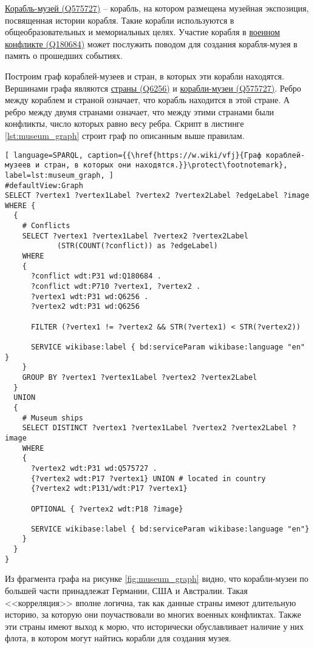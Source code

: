 \href{https://www.wikidata.org/wiki/Q575727}{Корабль-музей (Q575727)} -- корабль, на котором размещена музейная экспозиция, посвященная истории корабля. Такие корабли используются в общеобразовательных и мемориальных целях. Участие корабля в \href{https://www.wikidata.org/wiki/Q180684}{военном конфликте (Q180684)} может послужить поводом для создания корабля-музея в память о прошедших событиях. 

Построим граф кораблей-музеев и стран, в которых эти корабли находятся. Вершинами графа являются \href{https://www.wikidata.org/wiki/Q6256}{страны (Q6256)} и \href{https://www.wikidata.org/wiki/Q575727}{корабли-музеи (Q575727)}. Ребро между кораблем и страной означает, что корабль находится в этой стране. А ребро между двумя странами означает, что между этими странами были конфликты, число которых равно весу ребра. Скрипт в листинге \ref{lst:museum_graph} строит граф по описанным выше правилам.

\begin{lstlisting}[ language=SPARQL, caption={{\href{https://w.wiki/vfj}{Граф кораблей-музеев и стран, в которых они находятся.}}\protect\footnotemark}, label=lst:museum_graph, ]
#defaultView:Graph    
SELECT ?vertex1 ?vertex1Label ?vertex2 ?vertex2Label ?edgeLabel ?image 
WHERE {
  {
    # Conflicts
    SELECT ?vertex1 ?vertex1Label ?vertex2 ?vertex2Label 
            (STR(COUNT(?conflict)) as ?edgeLabel) 
    WHERE
    {
      ?conflict wdt:P31 wd:Q180684 .
      ?conflict wdt:P710 ?vertex1, ?vertex2 .
      ?vertex1 wdt:P31 wd:Q6256 . 
      ?vertex2 wdt:P31 wd:Q6256

      FILTER (?vertex1 != ?vertex2 && STR(?vertex1) < STR(?vertex2))
    
      SERVICE wikibase:label { bd:serviceParam wikibase:language "en" }
    }
    GROUP BY ?vertex1 ?vertex1Label ?vertex2 ?vertex2Label
  }
  UNION
  {
    # Museum ships
    SELECT DISTINCT ?vertex1 ?vertex1Label ?vertex2 ?vertex2Label ?image
    WHERE
    {
      ?vertex2 wdt:P31 wd:Q575727 .
      {?vertex2 wdt:P17 ?vertex1} UNION # located in country
      {?vertex2 wdt:P131/wdt:P17 ?vertex1}
        
      OPTIONAL { ?vertex2 wdt:P18 ?image}
        
      SERVICE wikibase:label { bd:serviceParam wikibase:language "en"}
    }
  }
}
\end{lstlisting}

Из фрагмента графа на рисунке \ref{fig:museum_graph} видно, что корабли-музеи по большей части принадлежат Германии, США и Австралии. Такая <<корреляция>> вполне логична, так как данные страны имеют длительную историю, за которую они поучаствовали во многих военных конфликтах. Также эти страны имеют выход к морю, что исторически обуславливает наличие у них флота, в котором могут найтись корабли для создания музея.


